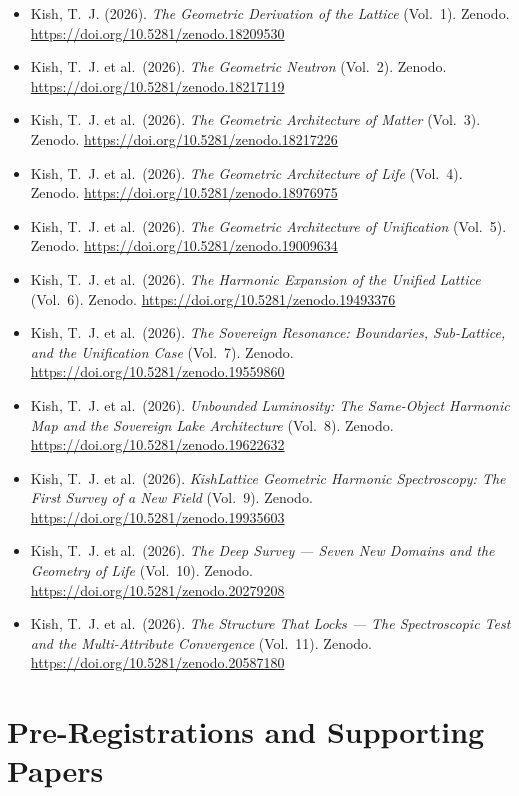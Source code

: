 \documentclass[11pt, letterpaper, openany]{book}
\begin{document}
\begin{itemize}
    \item Kish, T.~J. (2026). \textit{The Geometric Derivation of the Lattice} (Vol.~1).
          Zenodo. \url{https://doi.org/10.5281/zenodo.18209530}
    \item Kish, T.~J. et al.\ (2026). \textit{The Geometric Neutron} (Vol.~2).
          Zenodo. \url{https://doi.org/10.5281/zenodo.18217119}
    \item Kish, T.~J. et al.\ (2026). \textit{The Geometric Architecture of Matter} (Vol.~3).
          Zenodo. \url{https://doi.org/10.5281/zenodo.18217226}
    \item Kish, T.~J. et al.\ (2026). \textit{The Geometric Architecture of Life} (Vol.~4).
          Zenodo. \url{https://doi.org/10.5281/zenodo.18976975}
    \item Kish, T.~J. et al.\ (2026). \textit{The Geometric Architecture of Unification}
          (Vol.~5). Zenodo. \url{https://doi.org/10.5281/zenodo.19009634}
    \item Kish, T.~J. et al.\ (2026). \textit{The Harmonic Expansion of the Unified Lattice}
          (Vol.~6). Zenodo. \url{https://doi.org/10.5281/zenodo.19493376}
    \item Kish, T.~J. et al.\ (2026). \textit{The Sovereign Resonance: Boundaries,
          Sub-Lattice, and the Unification Case} (Vol.~7).
          Zenodo. \url{https://doi.org/10.5281/zenodo.19559860}
    \item Kish, T.~J. et al.\ (2026). \textit{Unbounded Luminosity: The Same-Object Harmonic
          Map and the Sovereign Lake Architecture} (Vol.~8).
          Zenodo. \url{https://doi.org/10.5281/zenodo.19622632}
    \item Kish, T.~J. et al.\ (2026). \textit{KishLattice Geometric Harmonic Spectroscopy:
          The First Survey of a New Field} (Vol.~9).
          Zenodo. \url{https://doi.org/10.5281/zenodo.19935603}
    \item Kish, T.~J. et al.\ (2026). \textit{The Deep Survey --- Seven New Domains and the
          Geometry of Life} (Vol.~10).
          Zenodo. \url{https://doi.org/10.5281/zenodo.20279208}
    \item Kish, T.~J. et al.\ (2026). \textit{The Structure That Locks --- The Spectroscopic
          Test and the Multi-Attribute Convergence} (Vol.~11).
          Zenodo. \url{https://doi.org/10.5281/zenodo.20587180}
\end{itemize}

\section*{Pre-Registrations and Supporting Papers}
\end{document}
